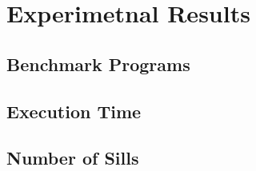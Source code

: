 \documentclass{article}
\begin{document}

\section{Experimetnal Results}
\subsection{Benchmark Programs}
\subsection{Execution Time}
\subsection{Number of Sills}


\end{document}
